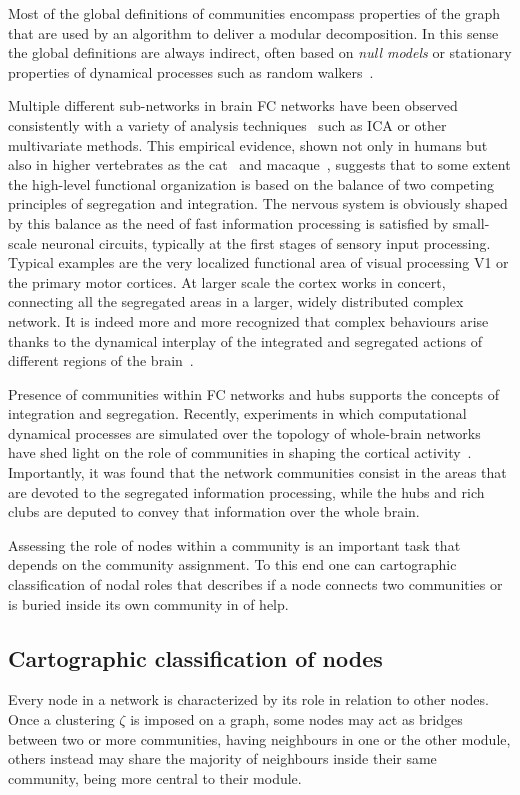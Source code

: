 Most of the global definitions of communities encompass properties of the graph that are used by an algorithm to deliver a modular decomposition.
In this sense the global definitions are always indirect, often based on \emph{null models} or stationary properties of dynamical processes such as random walkers~\cite{pons2006,rosvall2008}.

Multiple different sub-networks in brain FC networks have been observed consistently with a variety of analysis techniques~\cite{fox2005,deluca2006,salvador2005,schwarz2007} such as ICA or other multivariate methods.
This empirical evidence, shown not only in humans but also in higher vertebrates as the cat~\cite{scannell1995} and macaque~\cite{felleman1991}, suggests that to some extent the high-level functional organization is based on the balance of two competing principles of segregation and integration.
The nervous system is obviously shaped by this balance as the need of fast information processing is satisfied by small-scale neuronal circuits, typically at the first stages of sensory input processing.
Typical examples are the very localized functional area of visual processing V1 or the primary motor cortices. At larger scale the cortex works in concert, connecting all the segregated areas in a larger, widely distributed complex network.
It is indeed more and more recognized that complex behaviours arise thanks to the dynamical interplay of the integrated and segregated actions of different regions of the brain~\cite{tononi1994,tononi1998,deco2015}.

Presence of communities within FC networks and hubs supports the concepts of integration and segregation.
Recently, experiments in which computational dynamical processes are simulated over the topology of whole-brain networks have shed light on the role of communities in shaping the cortical activity~\cite{deco2015}.
Importantly, it was found that the network communities consist in the areas that are devoted to the segregated information processing, while the hubs and rich clubs are deputed to convey that information over the whole brain.

Assessing the role of nodes within a community is an important task that depends on the community assignment. To this end one can  cartographic classification of nodal roles that describes if a node connects two communities or is buried inside its own community in of help.

\subsection{Cartographic classification of nodes}
Every node in a network is characterized by its role in relation to other nodes.
Once a clustering $\zeta$ is imposed on a graph, some nodes may act as bridges between two or more communities, having neighbours in one or the other module, others instead may share the majority of neighbours inside their same community, being more central to their module.

